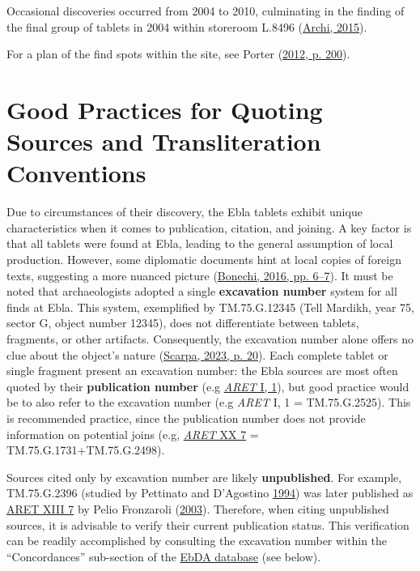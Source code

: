 \documentclass[
]{book}
\begin{document}
Occasional discoveries occurred from 2004 to 2010, culminating in the finding of the final group of tablets in 2004 within storeroom L.8496 (\protect\hyperlink{ref-Archi2015b}{Archi, 2015}).

For a plan of the find spots within the site, see Porter (\protect\hyperlink{ref-Porter2012}{2012, p. 200}).

\hypertarget{good-practices-for-quoting-sources-and-transliteration-conventions}{%
\section{Good Practices for Quoting Sources and Transliteration Conventions}\label{good-practices-for-quoting-sources-and-transliteration-conventions}}

Due to circumstances of their discovery, the Ebla tablets exhibit unique characteristics when it comes to publication, citation, and joining. A key factor is that all tablets were found at Ebla, leading to the general assumption of local production. However, some diplomatic documents hint at local copies of foreign texts, suggesting a more nuanced picture (\protect\hyperlink{ref-Bonechi2016k}{Bonechi, 2016, pp. 6--7}). It must be noted that archaeologists adopted a single \textbf{excavation number} system for all finds at Ebla. This system, exemplified by TM.75.G.12345 (Tell Mardikh, year 75, sector G, object number 12345), does not differentiate between tablets, fragments, or other artifacts. Consequently, the excavation number alone offers no clue about the object's nature (\protect\hyperlink{ref-Scarpa2023}{Scarpa, 2023, p. 20}). Each complete tablet or single fragment present an excavation number: the Ebla sources are most often quoted by their \textbf{publication number} (e.g \href{http://ebda.cnr.it/tablet/view/2}{\emph{ARET} I, 1}), but good practice would be to also refer to the excavation number (e.g \emph{ARET} I, 1 = TM.75.G.2525). This is recommended practice, since the publication number does not provide information on potential joins (e.g, \href{http://ebda.cnr.it/tablet/view/3096}{\emph{ARET} XX 7} = TM.75.G.1731+TM.75.G.2498).

Sources cited only by excavation number are likely \textbf{unpublished}. For example, TM.75.G.2396 (studied by Pettinato and D'Agostino \protect\hyperlink{ref-PettinatoDAgostino1994}{1994}) was later published as \href{http://ebda.cnr.it/tablet/view/2856}{ARET XIII 7} by Pelio Fronzaroli (\protect\hyperlink{ref-Fronzaroli2003a}{2003}). Therefore, when citing unpublished sources, it is advisable to verify their current publication status. This verification can be readily accomplished by consulting the excavation number within the ``Concordances'' sub-section of the \href{http://ebda.cnr.it/}{EbDA database} (see below).
\end{document}
